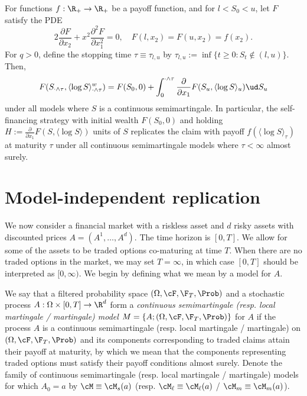 \documentclass[11pt]{article}
\begin{document}
\begin{proposition}
\label{proposition: Carr and Lee}
For functions $f: \R_+ \to \R_+$ be a payoff function, and for $l < S_0 < u$, let $F$ satisfy the PDE
\begin{equation}
\label{Carr-Lee PDE}
2 \frac{\partial F}{\partial x_2} + x^2 \frac{\partial^2 F}{\partial x_1^2} = 0, \quad F(l, x_2) = F(u, x_2)=f(x_2).
\end{equation}
For $q > 0$, define the stopping time $\tau \equiv \tau_{l,u}$ by $\tau_{l,u} := \inf \{t\geq0: S_t \not\in (l,u)\}$. Then,
\begin{equation}
\label{Carr-Lee integral representation}
F(S_{\cdot \wedge \tau},\langle \log S \rangle^w_{\cdot \wedge \tau}) = F(S_{0},0) + \int_{0}^{\cdot \wedge \tau} \frac{\partial}{\partial x_1} F(S_{u},\langle \log S \rangle_{u}) \ud S_{u}
\end{equation}
under all models where $S$ is a continuous semimartingale. In particular, the self-financing strategy with initial wealth $F(S_{0},0)$ and holding $H := \frac{\partial}{\partial x_1} F(S,\langle \log S \rangle)$ units of $S$ replicates the claim with payoff $f(\langle \log S \rangle_{\tau})$ at maturity $\tau$ under all continuous semimartingale models where $\tau < \infty$ almost surely.
\end{proposition}

\section{Model-independent replication}
\label{section: replication theory}

We now consider a financial market with a riskless asset and $d$ risky assets with discounted prices $A = (A^1,\ldots,A^d)$. The time horizon is $[0,T]$. We allow for some of the assets to be traded options co-maturing at time $T$. When there are no traded options in the market, we may set $T = \infty$, in which case $[0,T]$ should be interpreted as $[0,\infty)$. We begin by defining what we mean by a model for $A$.

\begin{definition}
\label{definition: continuous semimartingale model}
We say that a filtered probability space $(\Omega, \cF, \F_T, \Prob)$ and a stochastic process $A: \Omega \times [0,T] \to \R^d$ form a \textit{continuous semimartingale (resp. local martingale / martingale) model} $M = \{A; (\Omega, \cF, \F_T, \Prob)\}$ for $A$ if the process $A$ is a continuous semimartingale (resp. local martingale / martingale) on $(\Omega, \cF, \F_T, \Prob)$ and its components corresponding to traded claims attain their payoff at maturity, by which we mean that the components representing traded options must satisfy their payoff conditions almost surely. Denote the family of continuous semimartingale (resp. local martingale / martingale) models for which $A_0 = a$ by $\cM \equiv \cM_s(a)$ (resp. $\cM_\ell \equiv \cM_\ell(a)$ / $\cM_m \equiv \cM_m(a)$).
\end{definition}
\end{document}
